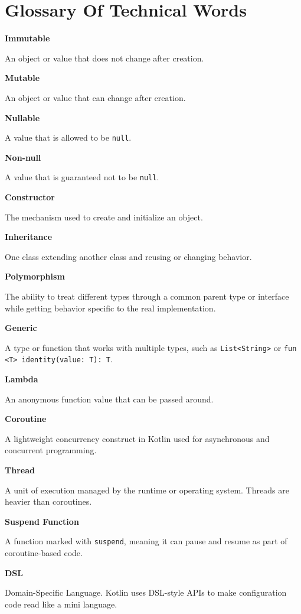 \documentclass[11pt,a4paper]{article}
\begin{document}
\section{Glossary Of Technical Words}

\textbf{Immutable}

An object or value that does not change after creation.

\textbf{Mutable}

An object or value that can change after creation.

\textbf{Nullable}

A value that is allowed to be \texttt{null}.

\textbf{Non-null}

A value that is guaranteed not to be \texttt{null}.

\textbf{Constructor}

The mechanism used to create and initialize an object.

\textbf{Inheritance}

One class extending another class and reusing or changing behavior.

\textbf{Polymorphism}

The ability to treat different types through a common parent type or interface while getting behavior specific to the real implementation.

\textbf{Generic}

A type or function that works with multiple types, such as \texttt{List<String>} or \texttt{fun <T> identity(value: T): T}.

\textbf{Lambda}

An anonymous function value that can be passed around.

\textbf{Coroutine}

A lightweight concurrency construct in Kotlin used for asynchronous and concurrent programming.

\textbf{Thread}

A unit of execution managed by the runtime or operating system. Threads are heavier than coroutines.

\textbf{Suspend Function}

A function marked with \texttt{suspend}, meaning it can pause and resume as part of coroutine-based code.

\textbf{DSL}

Domain-Specific Language. Kotlin uses DSL-style APIs to make configuration code read like a mini language.
\end{document}
